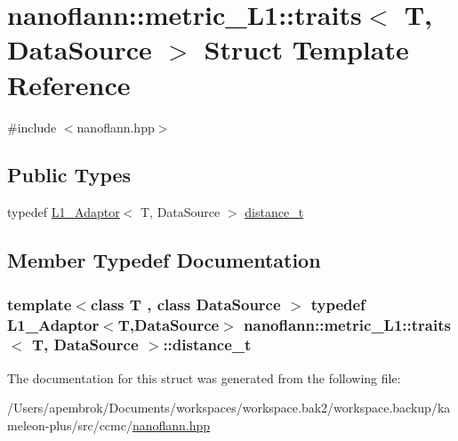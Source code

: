 \hypertarget{structnanoflann_1_1metric___l1_1_1traits}{\section{nanoflann\-:\-:metric\-\_\-\-L1\-:\-:traits$<$ T, Data\-Source $>$ Struct Template Reference}
\label{structnanoflann_1_1metric___l1_1_1traits}
}


{\ttfamily \#include $<$nanoflann.\-hpp$>$}

\subsection*{Public Types}
\begin{DoxyCompactItemize}
\item 
typedef \hyperlink{structnanoflann_1_1_l1___adaptor}{L1\-\_\-\-Adaptor}$<$ T, Data\-Source $>$ \hyperlink{structnanoflann_1_1metric___l1_1_1traits_ad665e193dcbcc2d1cca73964546f5e88}{distance\-\_\-t}
\end{DoxyCompactItemize}


\subsection{Member Typedef Documentation}
\hypertarget{structnanoflann_1_1metric___l1_1_1traits_ad665e193dcbcc2d1cca73964546f5e88}{
\subsubsection[{distance\-\_\-t}]{\setlength{\rightskip}{0pt plus 5cm}template$<$class T , class Data\-Source $>$ typedef {\bf L1\-\_\-\-Adaptor}$<$T,Data\-Source$>$ {\bf nanoflann\-::metric\-\_\-\-L1\-::traits}$<$ T, Data\-Source $>$\-::{\bf distance\-\_\-t}}}\label{structnanoflann_1_1metric___l1_1_1traits_ad665e193dcbcc2d1cca73964546f5e88}


The documentation for this struct was generated from the following file\-:\begin{DoxyCompactItemize}
\item 
/\-Users/apembrok/\-Documents/workspaces/workspace.\-bak2/workspace.\-backup/kameleon-\/plus/src/ccmc/\hyperlink{nanoflann_8hpp}{nanoflann.\-hpp}\end{DoxyCompactItemize}
